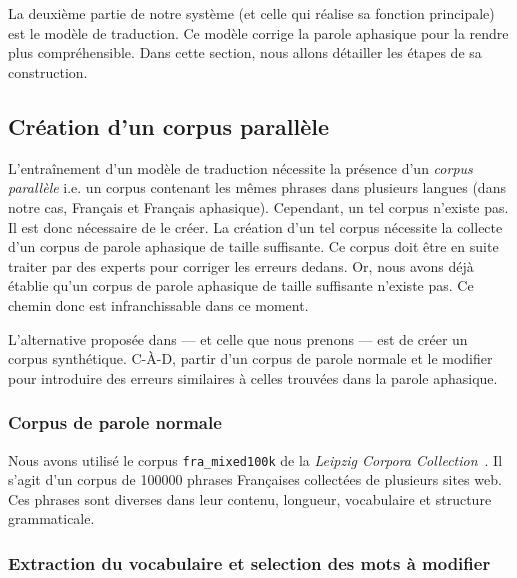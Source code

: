 \section{}

La deuxième partie de notre système (et celle qui réalise sa fonction principale) est le modèle de traduction.
Ce modèle corrige la parole aphasique pour la rendre plus compréhensible.
Dans cette section, nous allons détailler les étapes de sa construction.

\subsection{Création d'un corpus parallèle}

L'entraînement d'un modèle de traduction nécessite la présence d'un \emph{corpus parallèle}
i.e. un corpus contenant les mêmes phrases dans plusieurs langues (dans notre cas, Français et Français aphasique).
Cependant, un tel corpus n'existe pas. 
Il est donc nécessaire de le créer.
La création d'un tel corpus nécessite la collecte d'un corpus de parole aphasique de taille suffisante.
Ce corpus doit être en suite traiter par des experts pour corriger les erreurs dedans.
Or, nous avons déjà établie qu'un corpus de parole aphasique de taille suffisante n'existe pas.
Ce chemin donc est infranchissable dans ce moment.

L'alternative proposée dans \cite{Smaili_Langlois_Pribil_2022} --- et celle que nous prenons --- 
est de créer un corpus synthétique.
C-À-D, partir d'un corpus de parole normale et le modifier pour introduire 
des erreurs similaires à celles trouvées dans la parole aphasique.

\subsubsection{Corpus de parole normale}

Nous avons utilisé le corpus \texttt{fra\_mixed100k} de 
la \emph{\foreignlanguage{english}{Leipzig Corpora Collection}}~\cite{Goldhahn_Eckart_Quasthoff}.
Il s'agit d'un corpus de 100000 phrases Françaises collectées de plusieurs sites web.
Ces phrases sont diverses dans leur contenu, longueur, vocabulaire et structure grammaticale.

\subsubsection{Extraction du vocabulaire et selection des mots à modifier}

